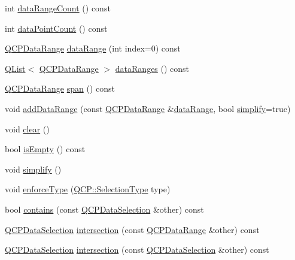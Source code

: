 \begin{DoxyCompactItemize}
\item 
int \hyperlink{class_q_c_p_data_selection_abd8869ccb231ab991e8576de931f647d}{data\+Range\+Count} () const
\item 
int \hyperlink{class_q_c_p_data_selection_ac9e74dd294778aa799216c3435c9c4f0}{data\+Point\+Count} () const
\item 
\hyperlink{class_q_c_p_data_range}{Q\+C\+P\+Data\+Range} \hyperlink{class_q_c_p_data_selection_a6956acf6a9a49a353b4f9b58608978ad}{data\+Range} (int index=0) const
\item 
\hyperlink{class_q_list}{Q\+List}$<$ \hyperlink{class_q_c_p_data_range}{Q\+C\+P\+Data\+Range} $>$ \hyperlink{class_q_c_p_data_selection_ac3b1c5e7713d380cd9e447f4556b94da}{data\+Ranges} () const
\item 
\hyperlink{class_q_c_p_data_range}{Q\+C\+P\+Data\+Range} \hyperlink{class_q_c_p_data_selection_a890f9291e0b7f065747040de5d68ff7d}{span} () const
\item 
void \hyperlink{class_q_c_p_data_selection_a46740c5aa7b80ae9b2abf6985d61b74f}{add\+Data\+Range} (const \hyperlink{class_q_c_p_data_range}{Q\+C\+P\+Data\+Range} \&\hyperlink{class_q_c_p_data_selection_a6956acf6a9a49a353b4f9b58608978ad}{data\+Range}, bool \hyperlink{class_q_c_p_data_selection_a4a2fbad1a6e4d1dd26fdfdf88956f2a4}{simplify}=true)
\item 
void \hyperlink{class_q_c_p_data_selection_a385dd665e6690d39afb8bbd727b1e00b}{clear} ()
\item 
bool \hyperlink{class_q_c_p_data_selection_a7f7526b475998dc0c3d6c376b24736c9}{is\+Empty} () const
\item 
void \hyperlink{class_q_c_p_data_selection_a4a2fbad1a6e4d1dd26fdfdf88956f2a4}{simplify} ()
\item 
void \hyperlink{class_q_c_p_data_selection_a17b84d852911531d229f4a76aa239a75}{enforce\+Type} (\hyperlink{namespace_q_c_p_ac6cb9db26a564b27feda362a438db038}{Q\+C\+P\+::\+Selection\+Type} type)
\item 
bool \hyperlink{class_q_c_p_data_selection_ab1ad3d5bbb55749c3f7ab1e45429c932}{contains} (const \hyperlink{class_q_c_p_data_selection}{Q\+C\+P\+Data\+Selection} \&other) const
\item 
\hyperlink{class_q_c_p_data_selection}{Q\+C\+P\+Data\+Selection} \hyperlink{class_q_c_p_data_selection_af5267ced53687561367105ee77b874ab}{intersection} (const \hyperlink{class_q_c_p_data_range}{Q\+C\+P\+Data\+Range} \&other) const
\item 
\hyperlink{class_q_c_p_data_selection}{Q\+C\+P\+Data\+Selection} \hyperlink{class_q_c_p_data_selection_af296ec5a948656c1d1ecb7b2970d2a24}{intersection} (const \hyperlink{class_q_c_p_data_selection}{Q\+C\+P\+Data\+Selection} \&other) const

\end{DoxyCompactItemize}
